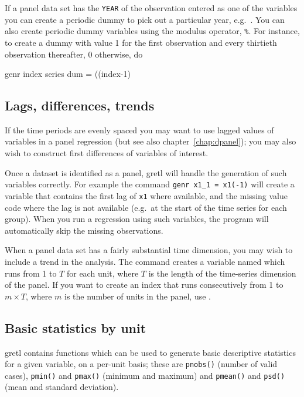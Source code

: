 If a panel data set has the \verb+YEAR+ of the observation entered as
one of the variables you can create a periodic dummy to pick out a
particular year, e.g.\ .  You can also
create periodic dummy variables using the modulus operator,
\verb+%+.  For instance, to create a dummy with
value 1 for the first observation and every thirtieth observation
thereafter, 0 otherwise, do
%
\begin{code}
genr index 
series dum = ((index-1) %
\end{code}

\subsection{Lags, differences, trends}
\label{panel-lagged}

If the time periods are evenly spaced you may want to use lagged
values of variables in a panel regression (but see also
chapter~\ref{chap:dpanel}); you may also wish to construct first
differences of variables of interest.

Once a dataset is identified as a panel, gretl will handle the
generation of such variables correctly.  For example the command
\verb+genr x1_1 = x1(-1)+ will create a variable that contains the
first lag of \verb+x1+ where available, and the missing value code
where the lag is not available (e.g.\ at the start of the time series
for each group).  When you run a regression using such variables, the
program will automatically skip the missing observations.

When a panel data set has a fairly substantial time dimension, you may
wish to include a trend in the analysis.  The command  
creates a variable named  which runs from 1 to $T$ for
each unit, where $T$ is the length of the time-series dimension of the
panel.  If you want to create an index that runs consecutively from 1
to $m\times T$, where $m$ is the number of units in the panel, use
.

\subsection{Basic statistics by unit}
\label{panel-stats}

gretl contains functions which can be used to generate basic
descriptive statistics for a given variable, on a per-unit basis;
these are \texttt{pnobs()} (number of valid cases), \texttt{pmin()}
and \texttt{pmax()} (minimum and maximum) and \texttt{pmean()} and
\texttt{psd()} (mean and standard deviation).

